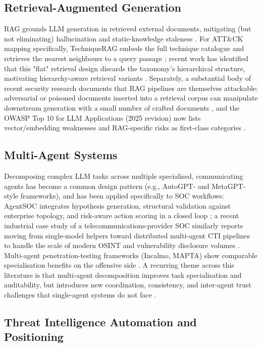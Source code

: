 \documentclass[runningheads]{llncs}
\begin{document}
\subsection{Retrieval-Augmented Generation}

RAG grounds LLM generation in retrieved external documents, mitigating (but not eliminating) hallucination and static-knowledge staleness \cite{lewis2020rag}. For ATT\&CK mapping specifically, TechniqueRAG embeds the full technique catalogue and retrieves the nearest neighbours to a query passage \cite{hierrag2026}; recent work has identified that this "flat" retrieval design discards the taxonomy's hierarchical structure, motivating hierarchy-aware retrieval variants \cite{hierrag2026}. Separately, a substantial body of recent security research documents that RAG pipelines are themselves attackable: adversarial or poisoned documents inserted into a retrieval corpus can manipulate downstream generation with a small number of crafted documents \cite{poisonedrag2025}, and the OWASP Top 10 for LLM Applications (2025 revision) now lists vector/embedding weaknesses and RAG-specific risks as first-class categories \cite{promptinjectionreview2026}.

\subsection{Multi-Agent Systems}

Decomposing complex LLM tasks across multiple specialised, communicating agents has become a common design pattern (e.g., AutoGPT- and MetaGPT-style frameworks), and has been applied specifically to SOC workflows: AgentSOC integrates hypothesis generation, structural validation against enterprise topology, and risk-aware action scoring in a closed loop \cite{agentsoc2026}; a recent industrial case study of a telecommunications-provider SOC similarly reports moving from single-model helpers toward distributed multi-agent CTI pipelines to handle the scale of modern OSINT and vulnerability disclosure volumes \cite{llmmaspatterns2026}. Multi-agent penetration-testing frameworks (Incalmo, MAPTA) show comparable specialisation benefits on the offensive side \cite{pentestcomparison2025}. A recurring theme across this literature is that multi-agent decomposition improves task specialisation and auditability, but introduces new coordination, consistency, and inter-agent trust challenges that single-agent systems do not face \cite{secureautonomous2026}.

\subsection{Threat Intelligence Automation and Positioning}
\end{document}
